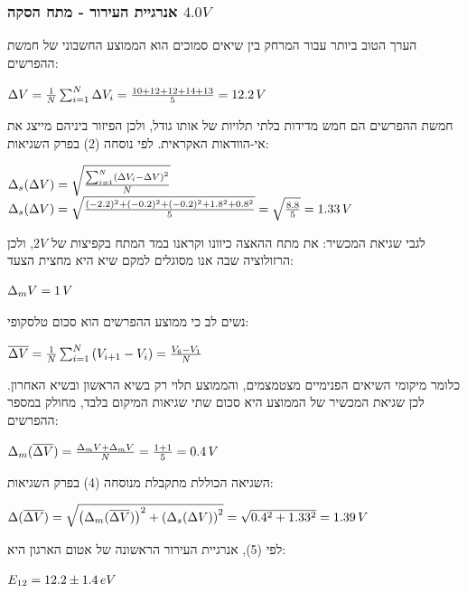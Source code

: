 \documentclass[14pt]{extarticle}
\makeatletter
\newenvironment{lefteqs}{%
    \begin{english}%
    \begin{flushleft}%
    \renewcommand{\arraystretch}{1.3}%
    $\begin{array}{@{}l@{}}%
}{%
    \end{array}$%
    \end{flushleft}%
    \end{english}%
}
\makeatother
\begin{document}
\subsubsection*{אנרגיית העירור - מתח הסקה $4.0V$}

הערך הטוב ביותר עבור המרחק בין שיאים סמוכים הוא הממוצע החשבוני של חמשת ההפרשים:
\begin{lefteqs}
    \Delta V = \frac{1}{N}\sum_{i=1}^{N} \Delta V_i
    = \frac{10 + 12 + 12 + 14 + 13}{5} = 12.2\,V
\end{lefteqs}

חמשת ההפרשים הם חמש מדידות בלתי תלויות של אותו גודל, ולכן הפיזור ביניהם מייצג את
אי-הוודאות האקראית. לפי נוסחה (2) בפרק השגיאות:
\begin{lefteqs}
    \Delta_s (\Delta V) = \sqrt{\frac{\sum_{i=1}^{N}\left(\Delta V_i - \Delta V\right)^2}{N}} \\
    \Delta_s (\Delta V) = \sqrt{\frac{(-2.2)^2 + (-0.2)^2 + (-0.2)^2 + 1.8^2 + 0.8^2}{5}}
    = \sqrt{\frac{8.8}{5}} = 1.33\,V
\end{lefteqs}

לגבי שגיאת המכשיר: את מתח ההאצה כיוונו וקראנו במד המתח בקפיצות של $2V$, ולכן הרזולוציה שבה
אנו מסוגלים למקם שיא היא מחצית הצעד:
\begin{lefteqs}
    \Delta_m V = 1\,V
\end{lefteqs}

נשים לב כי ממוצע ההפרשים הוא סכום טלסקופי:
\begin{lefteqs}
    \overline{\Delta V} = \frac{1}{N}\sum_{i=1}^{N}\left(V_{i+1} - V_i\right) = \frac{V_6 - V_1}{N}
\end{lefteqs}
כלומר מיקומי השיאים הפנימיים מצטמצמים, והממוצע תלוי רק בשיא הראשון ובשיא האחרון. לכן שגיאת
המכשיר של הממוצע היא סכום שתי שגיאות המיקום בלבד, מחולק במספר ההפרשים:
\begin{lefteqs}
    \Delta_m (\overline{\Delta V}) = \frac{\Delta_m V + \Delta_m V}{N} = \frac{1 + 1}{5} = 0.4\,V
\end{lefteqs}

השגיאה הכוללת מתקבלת מנוסחה (4) בפרק השגיאות:
\begin{lefteqs}
    \Delta(\overline{\Delta V}) = \sqrt{\left(\Delta_m(\overline{\Delta V})\right)^2 + \left(\Delta_s(\Delta V)\right)^2}
    = \sqrt{0.4^2 + 1.33^2} = 1.39\,V
\end{lefteqs}

לפי (5), אנרגיית העירור הראשונה של אטום הארגון היא:
\begin{lefteqs}
    E_{12} = 12.2 \pm 1.4\,eV
\end{lefteqs}
\end{document}
